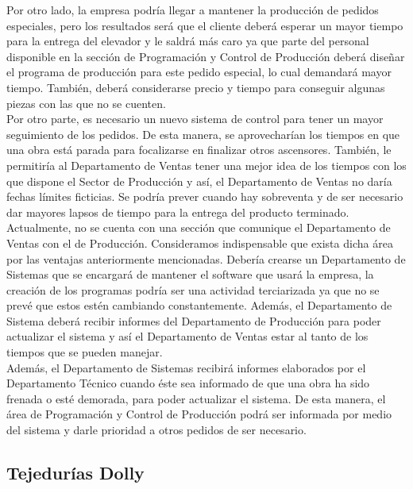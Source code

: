 \documentclass[a4paper,10pt,titlepage]{article}
\begin{document}
\begin{itemize}
Por otro lado, la empresa podría llegar a mantener la producción de pedidos especiales, pero los resultados será que el cliente deberá esperar un mayor tiempo para la entrega del elevador y le saldrá más caro ya que parte del personal disponible en la sección de Programación y Control de Producción deberá diseñar el programa de producción para este pedido especial, lo cual demandará mayor tiempo. También, deberá considerarse precio y tiempo para conseguir algunas piezas con las que no se cuenten.\\
Por otro parte, es necesario un nuevo sistema de control para tener un mayor seguimiento de los pedidos. De esta manera, se aprovecharían los tiempos en que una obra está parada para focalizarse en finalizar otros ascensores. También, le permitiría al Departamento de Ventas tener una mejor idea de los tiempos con los que dispone el Sector de Producción y así, el Departamento de Ventas no daría fechas límites ficticias. Se podría prever cuando hay sobreventa y de ser necesario dar mayores lapsos de tiempo para la entrega del producto terminado.\\
Actualmente, no se cuenta con una sección que comunique el Departamento de Ventas con el de Producción. Consideramos indispensable que exista dicha área por las ventajas anteriormente mencionadas. Debería crearse un Departamento de Sistemas que se encargará de mantener el software que usará la empresa, la creación de los programas podría ser una actividad terciarizada ya que no se prevé que estos estén cambiando constantemente. Además, el Departamento de Sistema deberá recibir informes del Departamento de Producción para poder actualizar el sistema y así el Departamento de Ventas estar al tanto de los tiempos que se pueden manejar. \\
Además, el Departamento de Sistemas recibirá informes elaborados por el Departamento Técnico cuando éste sea informado de que una obra ha sido frenada o esté demorada, para poder actualizar el sistema. De esta manera, el área de Programación y Control de Producción podrá ser informada por medio del sistema y darle prioridad a otros pedidos de ser necesario.\\

\end{itemize}




\newpage
\subsection{Tejedur\'ias Dolly}
\end{document}

